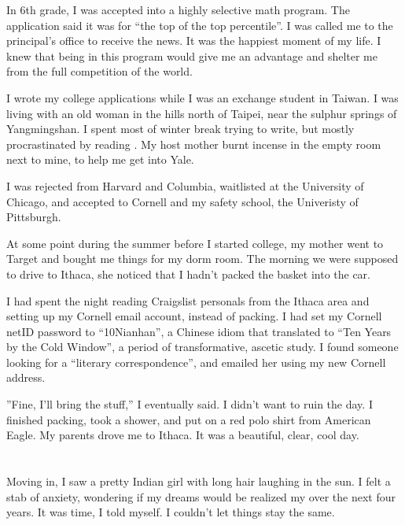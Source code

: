 \ledsection{}

In 6th grade, I was accepted into a highly selective math program.  The
application said it was for ``the top of the top percentile''.  I was called me
to the principal's office to receive the news.  It was the happiest moment of my
life.  I knew that being in this program would give me an advantage and shelter
me from the full competition of the world.

I wrote my college applications while I was an exchange student in Taiwan.  I
was living with an old woman in the hills north of Taipei, near the sulphur
springs of Yangmingshan.  I spent most of winter break trying to write, but
mostly procrastinated by reading .  My host
mother burnt incense in the empty room next to mine, to help me get into Yale.  

I was rejected from Harvard and Columbia, waitlisted at the University of
Chicago, and accepted to Cornell and my safety school, the Univeristy of
Pittsburgh.  

At some point during the summer before I started college, my mother went to
Target and bought me things for my dorm room.  The morning we were supposed to
drive to Ithaca, she noticed that I hadn't packed the basket into the car.  

I had spent the night reading Craigslist personals from the Ithaca area and
setting up my Cornell email account, instead of packing.   I had set my Cornell
netID password to ``10Nianhan'', a Chinese idiom that translated to ``Ten Years
by the Cold Window'', a period of transformative, ascetic study.  I found someone
looking for a ``literary correspondence'', and emailed her using my new Cornell
address.

''Fine, I'll bring the stuff,'' I eventually said.  I didn't want to ruin the
day.  I finished packing, took a shower, and put on a red polo shirt from
American Eagle.  My parents drove me to Ithaca.  It was a beautiful, clear, cool
day.  

\section{}

Moving in, I saw a pretty Indian girl with long hair laughing in the sun.  I
felt a stab of anxiety, wondering if my dreams would be realized my over the
next four years.  It was time, I told myself.  I couldn't let things stay the
same.

\section{}


